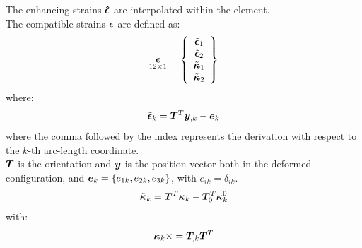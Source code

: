 The enhancing strains $\T{\hat{\epsilon}}$ are interpolated within the element.\\
The compatible strains $\T{\epsilon}$ are defined as:
\begin{equation}
\underset{ 12 \times 1 }{
 \T{\epsilon}
 } =
\cubr{\vvect{c}{
 \tilde{\T{\epsilon}}_1 \\
 \tilde{\T{\epsilon}}_2 \\
 \tilde{\T{\kappa} }_1 \\
 \tilde{\T{\kappa} }_2 \\
}}
\end{equation}
where:
\begin{equation}
\tilde{\T{\epsilon}}_k =
\TT{T} ^T \T{y}_{,k}  - \T{e}_k
\label{eq:epsilon}
\end{equation}
where the comma followed by the index represents the derivation with respect to the $k$-th arc-length coordinate.\\
$\TT{T}$ is the orientation and $\T{y}$ is the position vector both in the deformed configuration, and $\T{e}_k=\{e_{1k},e_{2k},e_{3k}\}$, with
$e_{ik}=\delta_{ik}$.
\begin{equation}
\tilde{\T{\kappa}}_k  =
\TT{T}^ T \T{\kappa}_k  - \TT{T}_0 ^ T  \T{\kappa}^{0}_k
\end{equation}
with:
\begin{equation}
\T{\kappa}_k  \times = \TT{T}_{,k} \TT{T}^T
\end{equation}

